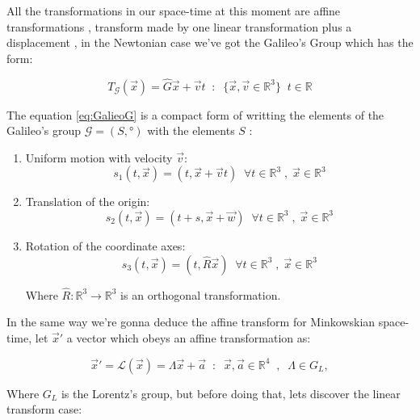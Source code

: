 \documentclass[spanish,notitlepage,letterpaper,11pt]{article} %
\begin{document}
All the transformations in our space-time at this moment are affine transformations , transform made by one linear transformation plus a displacement , in the Newtonian case we've got the Galileo's Group which has the form:

\begin{equation}\label{eq:GalieoG}
    T_\mathscr{G}(\vec{x}) = \hat{G}\vec{x} + \vec{v}t \;\; : \;\; \{\vec{x},\vec{v} \in \mathbb{R}^3\} \;\; t \in \mathbb{R}
\end{equation}

The equation \ref{eq:GalieoG} is a compact form of writting the elements of the Galileo's group $\mathscr{G} = (S , °)$ with the elements $S$ :

\begin{enumerate}
    \item Uniform motion with velocity $\vec{v}$:
    \begin{equation*}
        s_1(t,\vec{x}) = (t , \vec{x} + \vec{v}t) \;\; \forall t \in \mathbb{R}^3 \;,\; \vec{x} \in \mathbb{R}^3
    \end{equation*}
    
    \item Translation of the origin:
    \begin{equation*}
        s_2(t,\vec{x}) = (t + s , \vec{x} + \vec{w}) \;\; \forall t \in \mathbb{R}^3 \;,\; \vec{x} \in \mathbb{R}^3
    \end{equation*}
    
    \item Rotation of the coordinate axes:
    \begin{equation*}
        s_3(t,\vec{x}) = (t , \hat{R}\vec{x} ) \;\; \forall t \in \mathbb{R}^3 \;,\; \vec{x} \in \mathbb{R}^3
    \end{equation*}
    
    Where $\hat{R}: \mathbb{R}^3 \rightarrow \mathbb{R}^3$ is an orthogonal transformation.
\end{enumerate}

In the same way we're gonna deduce the affine transform for Minkowskian space-time, let $\vec{x}'$ a vector which obeys an affine transformation as:

\begin{equation*}
    \vec{x}' = \mathcal{L}(\vec{x}) = \Lambda \vec{x} + \vec{a} \;\; :\;\; \vec{x},\vec{a}\in \mathbb{R}^4 \;\;, \;\; \Lambda \in G_L,
\end{equation*}

Where $G_L$ is the Lorentz's group, but before doing that, lets discover the linear transform case:
\end{document}
